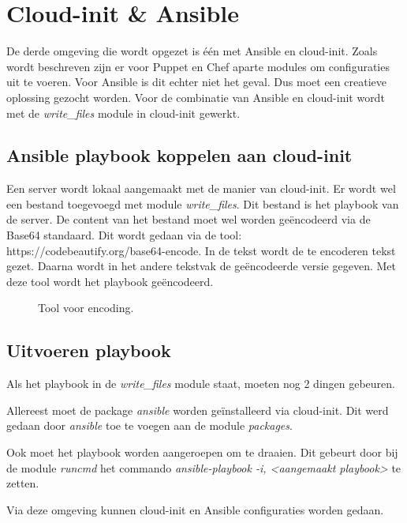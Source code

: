 \section{Cloud-init \& Ansible }
De derde omgeving die wordt opgezet is één met Ansible en cloud-init. Zoals wordt beschreven zijn er voor Puppet en Chef aparte modules om configuraties uit te voeren. Voor Ansible is dit echter niet het geval. Dus moet een creatieve oplossing gezocht worden. Voor de combinatie van Ansible en cloud-init wordt met de \textit{write\_files} module in cloud-init gewerkt. 

\subsection{Ansible playbook koppelen aan cloud-init}
Een server wordt lokaal aangemaakt met de manier van cloud-init. Er wordt wel een bestand toegevoegd met module \textit{write\_files}. Dit bestand is het playbook van de server. De content van het bestand moet wel worden geëncodeerd via de Base64 standaard. Dit wordt gedaan via de tool: https://codebeautify.org/base64-encode. In de tekst wordt de te encoderen tekst gezet. Daarna wordt in het andere tekstvak de geëncodeerde versie gegeven. Met deze tool wordt het playbook geëncodeerd.
\begin{figure}[!htb]
	\caption{Tool voor encoding.}
	\label{fig:base64}
\end{figure}

\newpage
\subsection{Uitvoeren playbook}
Als het playbook in de \textit{write\_files} module staat, moeten nog 2 dingen gebeuren. 

Allereest moet de package \textit{ansible} worden geïnstalleerd via cloud-init. Dit werd gedaan door \textit{ansible} toe te voegen aan de module \textit{packages}. 

Ook moet het playbook worden aangeroepen om te draaien. Dit gebeurt door bij de module \textit{runcmd} het commando \textit{ansible-playbook -i, <aangemaakt playbook>} te zetten.

Via deze omgeving kunnen cloud-init en Ansible configuraties worden gedaan.



